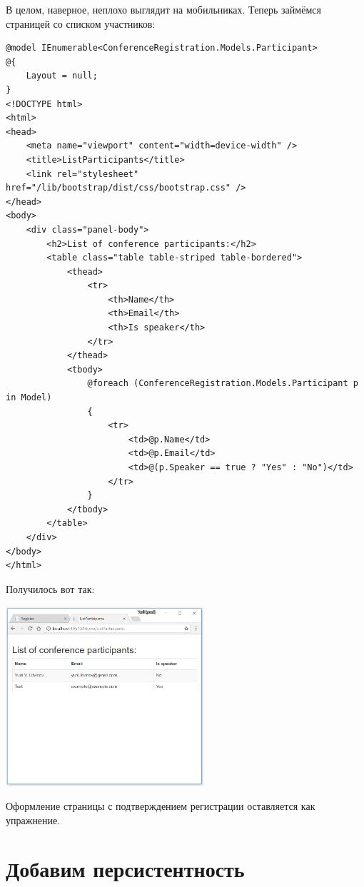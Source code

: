 \documentclass[a5paper]{article}
\begin{document}
В целом, наверное, неплохо выглядит на мобильниках. Теперь займёмся страницей со списком участников:

\begin{verbatim}
@model IEnumerable<ConferenceRegistration.Models.Participant>
@{
    Layout = null;
}
<!DOCTYPE html>
<html>
<head>
    <meta name="viewport" content="width=device-width" />
    <title>ListParticipants</title>
    <link rel="stylesheet" href="/lib/bootstrap/dist/css/bootstrap.css" />
</head>
<body>
    <div class="panel-body">
        <h2>List of conference participants:</h2>
        <table class="table table-striped table-bordered">
            <thead>
                <tr>
                    <th>Name</th>
                    <th>Email</th>
                    <th>Is speaker</th>
                </tr>
            </thead>
            <tbody>
                @foreach (ConferenceRegistration.Models.Participant p in Model)
                {
                    <tr>
                        <td>@p.Name</td>
                        <td>@p.Email</td>
                        <td>@(p.Speaker == true ? "Yes" : "No")</td>
                    </tr>
                }
            </tbody>
        </table>
    </div>
</body>
</html>
\end{verbatim}

Получилось вот так:

\begin{center}
	\includegraphics[width=0.55\textwidth]{styledListParticipants.png}
\end{center}

Оформление страницы с подтверждением регистрации оставляется как упражнение.

\section{Добавим персистентность}
\end{document}
